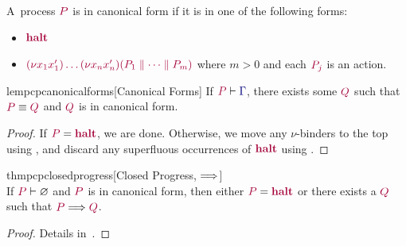 \documentclass[main.tex]{subfiles}
\begin{document}
\begin{definition}
  \label{def:pcp-canonical-forms}
  A~process $\tm{P}$ is in canonical form if it is in one of the following forms:
  \begin{itemize}[noitemsep,topsep=0pt,parsep=0pt,partopsep=0pt]
  \item
    $\tm{\halt}$
  \item
    $\tm{\res{x_1}{x'_1}{\dots\res{x_n}{x'_n}{(P_1 \parallel\dots\parallel P_m)}}}$
    where $m>0$ and each $\tm{P_j}$ is an action.
  \end{itemize}
\end{definition}

\begin{restatablelemma}{lempcpcanonicalforms}[Canonical Forms]
  \label{lem:pcp-canonical-forms}
  If $\seq{P}{\ty{\Gamma}}$, there exists some $\tm{Q}$ such that $\tm{P}\equiv\tm{Q}$ and $\tm{Q}$ is in canonical form.
\end{restatablelemma}
\begin{proof}
  If $\tm{P}=\tm{\halt}$, we are done. Otherwise, we move any $\nu$-binders to the top using , and discard any superfluous occurrences of $\tm{\halt}$ using .
\end{proof}
\begin{restatabletheorem}{thmpcpclosedprogress}[Closed Progress, $\Longrightarrow$]
  \label{thm:pcp-closed-progress}
  \hfill\\%
  If $\seq{P}{\emptyenv}$ and $\tm{P}$ is in canonical form, then either $\tm{P}=\tm{\halt}$ or there exists a $\tm{Q}$ such that $\tm{P}\red\tm{Q}$.
\end{restatabletheorem}
\begin{proof}
  Details in~.
\end{proof}
\end{document}
